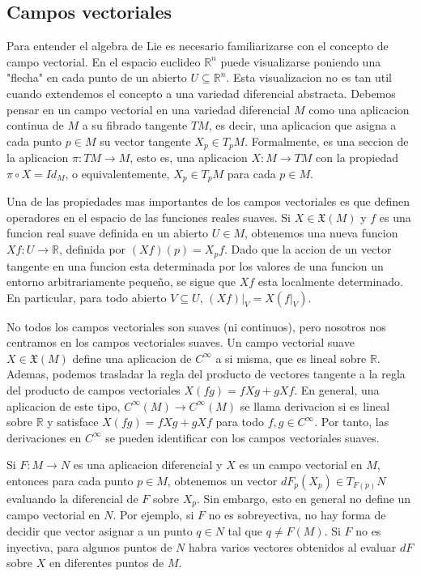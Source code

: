 \documentclass[12pt]{extarticle}
\newcommand{\R}{\mathbb{R}}
\newcommand{\<}{\langle}
\renewcommand{\>}{\rangle}
\theoremstyle{definition}
\begin{document}
\subsection{Campos vectoriales}
Para entender el algebra de Lie es necesario familiarizarse con el concepto de
campo vectorial. En el espacio euclideo $\R^n$ puede visualizarse poniendo una
"flecha" en cada punto de un abierto $U \subseteq \R^n$. Esta visualizacion no
es tan util cuando extendemos el concepto a una variedad diferencial abstracta.
Debemos pensar en un campo vectorial en una variedad diferencial $M$
como una aplicacion continua de $M$ a su fibrado tangente $TM$, es decir, una
aplicacion que asigna a cada punto $p \in M$ su vector tangente $X_p \in T_pM$.
Formalmente, es una seccion de la aplicacion $\pi: TM \rightarrow M$, esto es,
una aplicacion $X: M \rightarrow TM$ con la propiedad $\pi \circ X = Id_M$, o
equivalentemente, $X_p \in T_pM$ para cada $p \in M$.

Una de las propiedades mas importantes de los campos vectoriales es que definen
operadores en el espacio de las funciones reales suaves. Si $X \in
\mathfrak{X}(M)$ y $f$ es una funcion real suave definida en un abierto $U \in
M$, obtenemos una nueva funcion $Xf : U \rightarrow \R$, definida por $(Xf)(p) =
X_p f$. Dado que la accion de un vector tangente en una funcion esta determinada
por los valores de una funcion un entorno arbitrariamente pequeño, se sigue que
$Xf$ esta localmente determinado. En particular, para todo abierto $V \subseteq
U$, $(Xf)|_V = X (f|_V)$.

No todos los campos vectoriales son suaves (ni continuos), pero nosotros nos
centramos en los campos vectoriales suaves. Un campo vectorial suave $X \in
\mathfrak{X}(M)$ define una aplicacion de $C^{\infty}$ a si misma, que es lineal
sobre $\R$. Ademas, podemos trasladar la regla del producto de vectores tangente
a la regla del producto de campos vectoriales $X(fg) = f Xg + gXf$. En general,
una aplicacion de este tipo, $C^{\infty}(M) \rightarrow C^{\infty}(M)$ se
llama derivacion si es lineal sobre $\R$ y satisface $X(fg) = f Xg + gXf$ para
todo $f, g \in C^\infty$. Por tanto, las derivaciones en $C^\infty$ se pueden
identificar con los campos vectoriales suaves.

Si $F:M\rightarrow N$ es una aplicacion diferencial y $X$ es un campo vectorial
en $M$, entonces para cada punto $p \in M$, obtenemos un vector $dF_p(X_p) \in
T_{F(p)}N$ evaluando la diferencial de $F$ sobre $X_p$. Sin embargo, esto en
general no define un campo vectorial en $N$. Por ejemplo, si $F$ no es
sobreyectiva, no hay forma de decidir que vector asignar a un punto $q \in N$
tal que $q \neq F(M)$. Si $F$ no es inyectiva, para algunos puntos de $N$ habra
varios vectores obtenidos al evaluar $dF$ sobre $X$ en diferentes puntos de $M$.
\end{document}
